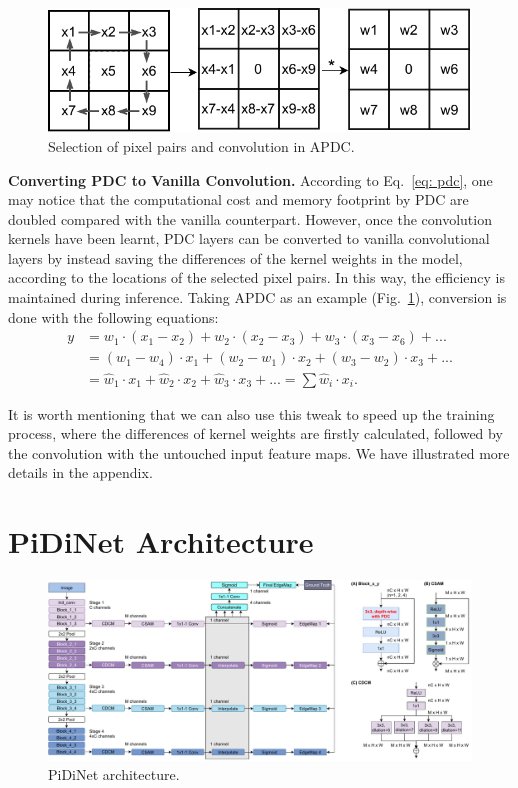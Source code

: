 \documentclass[10pt,twocolumn,letterpaper]{article}
\begin{document}
\begin{figure}[h]
    \centering
    \includegraphics[width=0.8\linewidth]{images/APDC.pdf}
    \caption{Selection of pixel pairs and convolution in APDC.}
    \label{fig:apdc}
\end{figure}

\vspace{0.3em}
\noindent \textbf{Converting PDC to Vanilla Convolution.} \quad
According to Eq.~\ref{eq: pdc}, one may notice that the computational cost and memory footprint by PDC are doubled compared with the vanilla counterpart. However, once the convolution kernels have been learnt, PDC layers can be converted to vanilla convolutional layers by instead saving the differences of the kernel weights in the model, according to the locations of the selected pixel pairs. In this way, the efficiency is maintained during inference. Taking APDC as an example (Fig.~\ref{fig:apdc}), conversion is done with the following equations:
{\small 
\begin{align}
    y &= w_{1}\cdot (x_1 - x_2) + w_2\cdot (x_2 - x_3)+w_3\cdot (x_3 - x_6) + ... \nonumber\\
    &=(w_1 - w_4)\cdot x_1 + (w_2 - w_1)\cdot x_2 + (w_3 - w_2)\cdot x_3 + ...\nonumber\\
    &=\hat{w}_1\cdot x_1 + \hat{w}_2\cdot x_2 + \hat{w}_3\cdot x_3 + ... =\sum \hat{w}_i\cdot x_i.
\end{align}
}

It is worth mentioning that we can also use this tweak to speed up the training process, where the differences of kernel weights are firstly calculated, followed by the convolution with the untouched input feature maps. We have illustrated more details in the appendix.


\section{PiDiNet Architecture}

\begin{figure}[t!]
    \centering
    \includegraphics[width=0.98\linewidth]{images/arch.pdf}
    \caption{PiDiNet architecture.}
    \label{fig:arch}
\end{figure}
\end{document}
